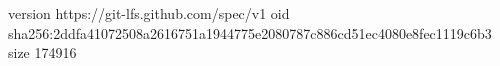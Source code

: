 version https://git-lfs.github.com/spec/v1
oid sha256:2ddfa41072508a2616751a1944775e2080787c886cd51ec4080e8fec1119c6b3
size 174916
